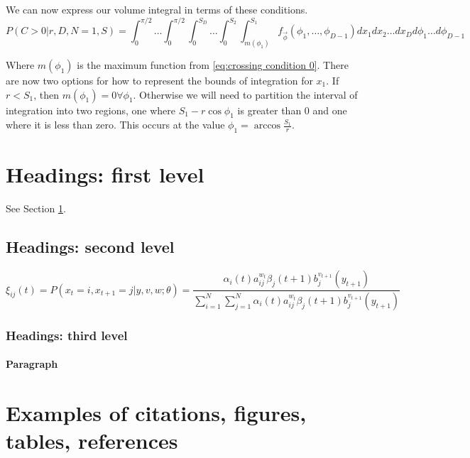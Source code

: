 \documentclass{article}
\begin{document}
We can now express our volume integral in terms of these conditions.
\begin{equation} \label{eq:volume integral}
	P(C>0|r, D, N=1, S)= \int_0^{\pi/2} \hdots \int_0^{\pi/2} \int_0^{S_D} \hdots \int_0^{S_2} \int_{m(\phi_1)}^{S_1} f_{\vec\phi}(\phi_1,\hdots,\phi_{D-1})dx_1 dx_2 \hdots dx_D d\phi_1 \hdots d\phi_{D-1}
\end{equation}

Where $m(\phi_1)$ is the maximum function from \ref{eq:crossing condition 0}. There are now two options for how to represent the bounds of integration for $x_1$. If
$r<S_1$, then $m(\phi_1)=0 \forall \phi_1$. Otherwise we will need to partition the interval of integration into two regions, one where $S_1-r\cos{\phi_1}$ is greater than 0
and one where it is less than zero. This occurs at the value $\phi_1 = \arccos{\frac{S_1}{r}}$. 



\section{Headings: first level}
\label{sec:headings}

\lipsum[4] See Section \ref{sec:headings}.

\subsection{Headings: second level}
\lipsum[5]
\begin{equation} 
	\xi _{ij}(t)=P(x_{t}=i,x_{t+1}=j|y,v,w;\theta)= {\frac {\alpha _{i}(t)a^{w_t}_{ij}\beta _{j}(t+1)b^{v_{t+1}}_{j}(y_{t+1})}{\sum _{i=1}^{N} \sum _{j=1}^{N} \alpha _{i}(t)a^{w_t}_{ij}\beta _{j}(t+1)b^{v_{t+1}}_{j}(y_{t+1})}}
\end{equation}



\subsubsection{Headings: third level}
\lipsum[6]

\paragraph{Paragraph}
\lipsum[7]



\section{Examples of citations, figures, tables, references}
\label{sec:others}
\end{document}
